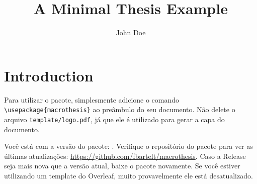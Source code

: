 \documentclass[dissertation,master,firstlang=english,secondlang=brazil]{macrothesis}
\title{A Minimal Thesis Example}
\author{John Doe}
\begin{document}
\maketitlepage
\preamblepage

\chapter{Introduction}
Para utilizar o pacote, simplesmente adicione o comando \texttt{\textbackslash usepackage\{macrothesis\}} ao preâmbulo do seu documento. Não delete o arquivo \texttt{template/logo.pdf}, já que ele é utilizado para gerar a capa do documento. 

Você está com a versão do pacote: \macrothesisversion. Verifique o repositório do pacote para ver as últimas atualizações: \url{https://github.com/fbartelt/macrothesis}. Caso a Release seja mais nova que a versão atual, baixe o pacote novamente. Se você estiver utilizando um template do Overleaf, muito provavelmente ele está desatualizado.
\end{document}
